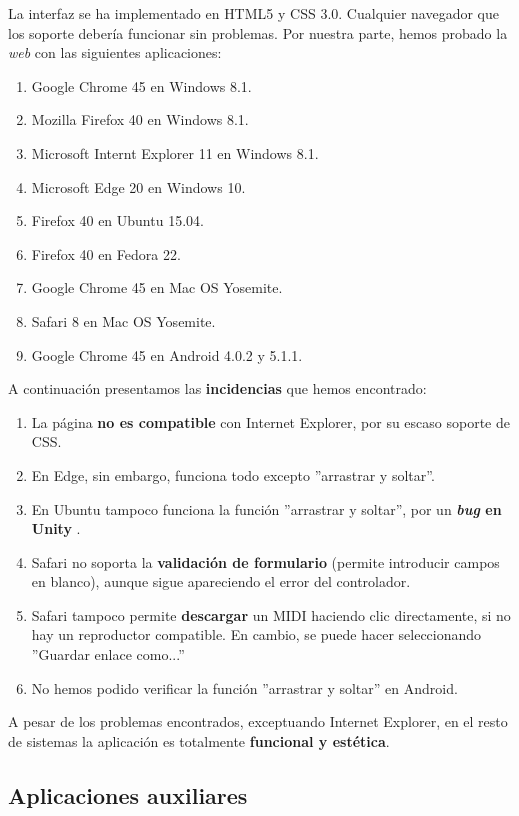 La interfaz se ha implementado en \acrshort{HTML}5 y \acrshort{CSS} 3.0. Cualquier navegador que los soporte debería funcionar sin problemas. Por nuestra parte, hemos probado la \textit{web} con las siguientes aplicaciones:

\begin{enumerate}
	\item Google Chrome 45 en Windows 8.1.
	\item Mozilla Firefox 40 en Windows 8.1.
	\item Microsoft Internt Explorer 11 en Windows 8.1.
	\item Microsoft Edge 20 en Windows 10.
	\item Firefox 40 en Ubuntu 15.04.
	\item Firefox 40 en Fedora 22.
	\item Google Chrome 45 en Mac OS Yosemite.
	\item Safari 8 en Mac OS Yosemite.
	\item Google Chrome 45 en Android 4.0.2 y 5.1.1.
\end{enumerate}

A continuación presentamos las \textbf{incidencias} que hemos encontrado:

\begin{enumerate}
	\item La página \textbf{no es compatible} con Internet Explorer, por su escaso soporte de \acrshort{CSS}.
	\item En Edge, sin embargo, funciona todo excepto ''arrastrar y soltar''.
	\item En Ubuntu tampoco funciona la función ''arrastrar y soltar'', por un \textbf{\textit{bug} en Unity} \cite{unity_bug}.
	\item Safari no soporta la \textbf{validación de formulario} (permite introducir campos en blanco), aunque sigue apareciendo el error del controlador.
	\item Safari tampoco permite \textbf{descargar} un \acrshort{MIDI} haciendo clic directamente, si no hay un reproductor compatible. En cambio, se puede hacer seleccionando ''Guardar enlace como...''
	\item No hemos podido verificar la función ''arrastrar y soltar'' en Android.
\end{enumerate}

A pesar de los problemas encontrados, exceptuando Internet Explorer, en el resto de sistemas la aplicación es totalmente \textbf{funcional y estética}. 

\subsection{Aplicaciones auxiliares}

